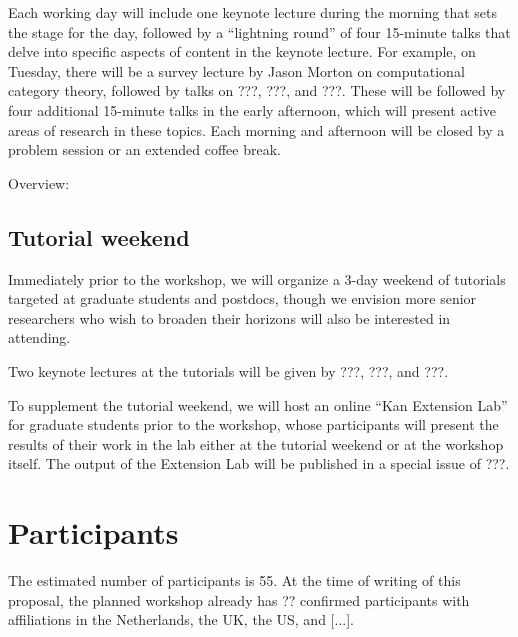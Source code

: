 \documentclass{article}
\newcommand{\redout}[1]{{\color{red}#1}}
\begin{document}
Each working day will include one keynote lecture during the morning that sets the stage for the day, followed by a ``lightning round'' of four 15-minute talks that delve into specific aspects of content in the keynote lecture. For example, on Tuesday, there will be a survey lecture by \redout{Jason Morton} on computational category theory, followed by talks on \redout{???}, \redout{???}, and \redout{???}. These will be followed by four additional 15-minute talks in the early afternoon, which will present active areas of research in these topics. Each morning and afternoon will be closed by a problem session or an extended coffee break. 

Overview: 


\subsection{Tutorial weekend}
Immediately prior to the workshop, we will organize a 3-day weekend of tutorials targeted at graduate students and postdocs, though we envision more senior researchers who wish to broaden their horizons will also be interested in attending.

Two keynote lectures at the tutorials will be given by \redout{???, ???, and ???}.

To supplement the tutorial weekend, we will host an online ``Kan Extension Lab'' for graduate students prior to the workshop, whose participants will present the results of their work in the lab either at the tutorial weekend or at the workshop itself. The output of the Extension Lab will be published in a special issue of \redout{???}.

\section{Participants}
The estimated number of participants is 55. At the time of writing of this proposal, the planned workshop already has ?? confirmed participants with affiliations in the Netherlands, the UK, the US, and [...].
\end{document}
